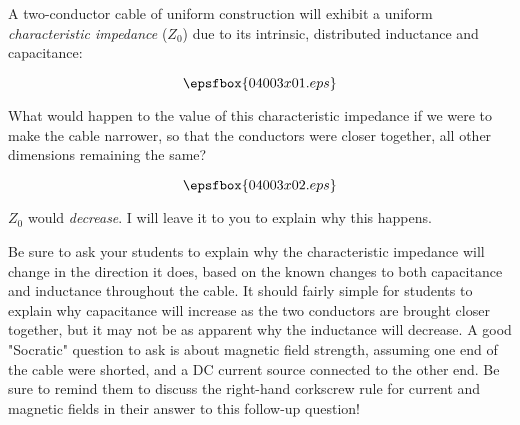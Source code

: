 

A two-conductor cable of uniform construction will exhibit a uniform {\it characteristic impedance} ($Z_0$) due to its intrinsic, distributed inductance and capacitance:

$$\epsfbox{04003x01.eps}$$

What would happen to the value of this characteristic impedance if we were to make the cable narrower, so that the conductors were closer together, all other dimensions remaining the same?

$$\epsfbox{04003x02.eps}$$







$Z_0$ would {\it decrease}.  I will leave it to you to explain why this happens.







Be sure to ask your students to explain why the characteristic impedance will change in the direction it does, based on the known changes to both capacitance and inductance throughout the cable.  It should fairly simple for students to explain why capacitance will increase as the two conductors are brought closer together, but it may not be as apparent why the inductance will decrease.  A good "Socratic" question to ask is about magnetic field strength, assuming one end of the cable were shorted, and a DC current source connected to the other end.  Be sure to remind them to discuss the right-hand corkscrew rule for current and magnetic fields in their answer to this follow-up question!




